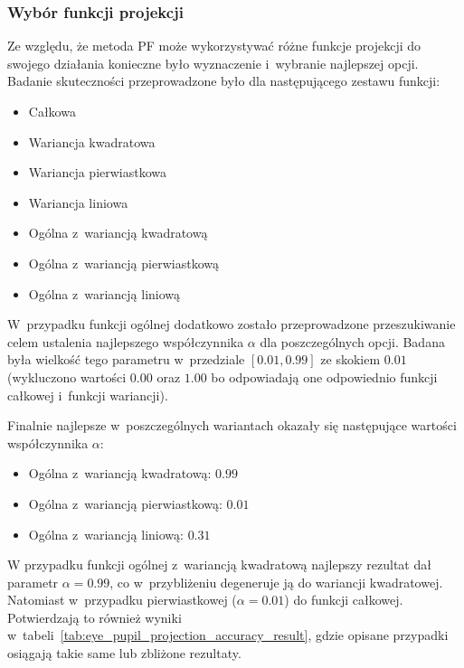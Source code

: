 \subsubsection{Wybór funkcji projekcji}

Ze względu, że metoda PF może wykorzystywać różne funkcje projekcji do swojego działania konieczne było wyznaczenie i~wybranie najlepszej opcji. Badanie skuteczności przeprowadzone było dla następującego zestawu funkcji:

\begin{itemize}
    \item Całkowa
    \item Wariancja kwadratowa
    \item Wariancja pierwiastkowa
    \item Wariancja liniowa
    \item Ogólna z~wariancją kwadratową
    \item Ogólna z~wariancją pierwiastkową
    \item Ogólna z~wariancją liniową
\end{itemize}

W~przypadku funkcji ogólnej dodatkowo zostało przeprowadzone przeszukiwanie celem ustalenia najlepszego współczynnika $\alpha$ dla poszczególnych opcji. Badana była wielkość tego parametru w~przedziale $[0.01, 0.99]$ ze skokiem $0.01$ (wykluczono wartości $0.00$ oraz $1.00$ bo odpowiadają one odpowiednio funkcji całkowej i~funkcji wariancji).

\par

Finalnie najlepsze w~poszczególnych wariantach okazały się następujące wartości współczynnika $\alpha$:

\begin{itemize}
    \item Ogólna z~wariancją kwadratową: $0.99$
    \item Ogólna z~wariancją pierwiastkową: $0.01$
    \item Ogólna z~wariancją liniową: $0.31$
\end{itemize}

W przypadku funkcji ogólnej z~wariancją kwadratową najlepszy rezultat dał parametr $\alpha=0.99$, co w~przybliżeniu degeneruje ją do wariancji kwadratowej. Natomiast w~przypadku pierwiastkowej ($\alpha=0.01$) do funkcji całkowej. Potwierdzają to również wyniki w~tabeli~\ref{tab:eye_pupil_projection_accuracy_result}, gdzie opisane przypadki osiągają takie same lub zbliżone rezultaty.

